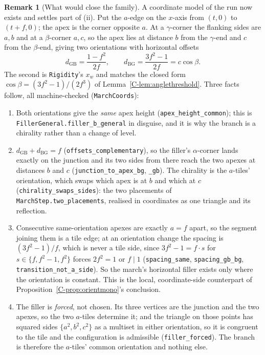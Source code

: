 \documentclass[11pt,reqno]{amsart}
\theoremstyle{plain}
\theoremstyle{definition}
\newtheorem{remark}[theorem]{Remark}
\begin{document}
\begin{remark}[What would close the family]
A coordinate model of the run now exists and settles part of (ii). Put the $a$-edge on the
$x$-axis from $(t,0)$ to $(t+f,0)$; the apex is the corner opposite $a$. At a $\gamma$-corner the
flanking sides are $a,b$ and at a $\beta$-corner $a,c$, so the apex lies at distance $b$ from the
$\gamma$-end and $c$ from the $\beta$-end, giving two orientations with horizontal offsets
\[
d_{\mathrm{GB}}=\frac{1-f^2}{2f},\qquad d_{\mathrm{BG}}=\frac{3f^2-1}{2f}=c\cos\beta .
\]
The second is \texttt{Rigidity}'s $x_w$ and matches the closed form $\cos\beta=(3f^2-1)/(2f^3)$ of
Lemma~\ref{C-lem:anglethreshold}. Three facts follow, all machine-checked
(\texttt{MarchCoords}):
\begin{enumerate}
\item[\textup{(a)}] Both orientations give the \emph{same} apex height
(\texttt{apex\_height\_common}); this is \texttt{FillerGeneral.filler\_b\_general} in disguise, and
it is why the branch is a chirality rather than a change of level.
\item[\textup{(b)}] $d_{\mathrm{GB}}+d_{\mathrm{BG}}=f$ (\texttt{offsets\_complementary}), so the
filler's $\alpha$-corner lands exactly on the junction and its two sides from there reach the two
apexes at distances $b$ and $c$ (\texttt{junction\_to\_apex\_bg}, \texttt{\_gb}). The chirality is
the $a$-tiles' orientation, which swaps which apex is at $b$ and which at $c$
(\texttt{chirality\_swaps\_sides}): the two placements of \texttt{MarchStep.two\_placements},
realised in coordinates as one triangle and its reflection.
\item[\textup{(c)}] Consecutive same-orientation apexes are exactly $a=f$ apart, so the segment
joining them is a tile edge; at an orientation change the spacing is $(3f^2-1)/f$, which is never a
tile side, since $3f^2-1=f\cdot s$ for $s\in\{f,f^2-1,f^2\}$ forces $2f^2=1$ or $f\mid 1$
(\texttt{spacing\_same}, \texttt{spacing\_gb\_bg}, \texttt{transition\_not\_a\_side}). So the
march's horizontal filler exists only where the orientation is constant. This is the local,
coordinate-side counterpart of Proposition~\ref{C-prop:orientmono}'s conclusion.
\item[\textup{(d)}] The filler is \emph{forced}, not chosen. Its three vertices are the junction and
the two apexes, so the two $a$-tiles determine it; and the triangle on those points has squared
sides $\{a^2,b^2,c^2\}$ as a multiset in either orientation, so it is congruent to the tile and the
configuration is admissible (\texttt{filler\_forced}). The branch is therefore the $a$-tiles' common
orientation and nothing else.
\end{enumerate}


\end{remark}
\end{document}
